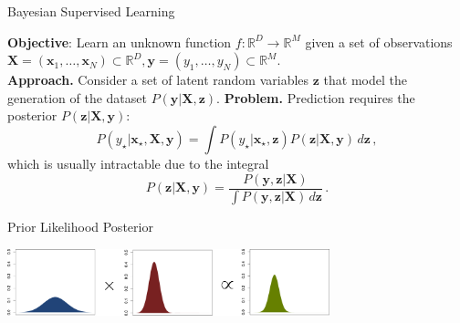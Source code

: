 
 \begin{frame}{Bayesian Supervised Learning}
    \begin{overprint}
            \vspace{0.5cm}
            \textbf{Objective}: Learn an unknown function \(f:\mathbb R^D \to \mathbb R^M\) given a set of observations \(\mathbf X = (\mathbf x_1,\dots,\mathbf x_N) \subset \mathbb R^D, \mathbf y = (y_1,\dots,y_N) \subset \mathbb R^M\).\\
        
            \textbf{Approach. }Consider a set of latent random variables \(\mathbf z\) that model the generation of the dataset \(P(\mathbf y | \mathbf X, \mathbf z)\).
        \vspace{0.5cm}
          \textbf{Problem. }Prediction requires the posterior \(P(\mathbf z | \mathbf X, \mathbf y)\):
            \[
                P(y_\star | \mathbf x_\star, \mathbf X, \mathbf y) = \int P(y_\star | \mathbf x_\star, \mathbf z)P(\mathbf z | \mathbf X, \mathbf y)\, d\mathbf z\,,
            \]
            which is usually intractable due to the integral
            \[
                P(\mathbf z | \mathbf X, \mathbf y) = \frac{P(\mathbf y, \mathbf{z}|\mathbf X)}{\int P(\mathbf y, \mathbf{z}|\mathbf X) \, d\mathbf z}\,.
            \]
    \end{overprint}
    
    \begin{overprint}
        \vspace{0.3cm}
        \hspace{2.5cm} Prior \hspace{1.7cm} Likelihood  \hspace{1.4cm} Posterior
        \begin{center}
        \includegraphics[width=0.7\textwidth]{imgs/bayes_rule.pdf}
        \end{center}
    \end{overprint}
\end{frame}